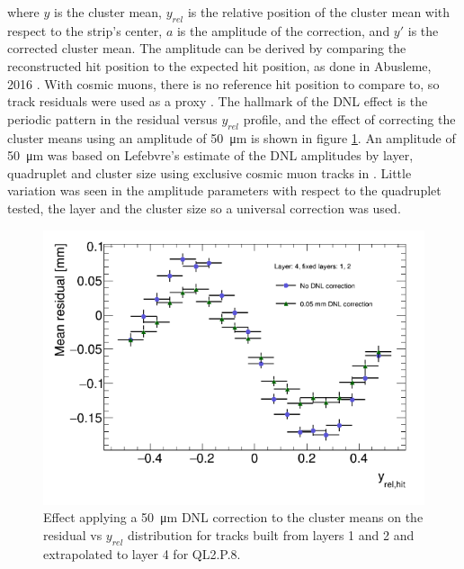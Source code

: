 where $y$ is the cluster mean, $y_{rel}$ is the relative position of the cluster mean with respect to the strip's center, $a$ is the amplitude of the correction, and $y'$ is the corrected cluster mean. The amplitude can be derived by comparing the reconstructed hit position to the expected hit position, as done in Abusleme, 2016 \cite{abusleme_performance_2016}. With cosmic muons, there is no reference hit position to compare to, so track residuals were used as a proxy \cite{lefebvre_thesis}. The hallmark of the DNL effect is the periodic pattern in the residual versus $y_{rel}$ profile, and the effect of correcting the cluster means using an amplitude of \SI{50}{\micro\meter} is shown in figure \ref{fig:dnl_corr_effect}. An amplitude of \SI{50}{\micro\meter} was based on Lefebvre's estimate of the DNL amplitudes by layer, quadruplet and cluster size using exclusive cosmic muon tracks in . Little variation was seen in the amplitude parameters with respect to the quadruplet tested, the layer and the cluster size so a universal correction was used.

\begin{figure}
    \centering
    \includegraphics[width = \textwidth]{figures/figure_dnl_profiles_blue_QL2P08_3100V_2021-06-18_no_dnl_green_QL2P08_3100V_2021-06-18_2_50um_universal_DNL_layer4_fixed12.png}
    \caption{Effect applying a \SI{50}{\micro\meter} DNL correction to the cluster means on the residual vs $y_{rel}$ distribution for tracks built from layers 1 and 2 and extrapolated to layer 4 for QL2.P.8.}
    \label{fig:dnl_corr_effect}
\end{figure} 

